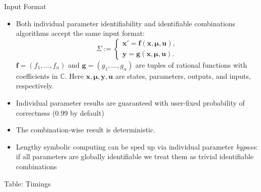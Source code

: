 \documentclass[final,hyperref={pdfpagelabels=false}]{beamer}
\begin{document}
\begin{frame}[t]
\begin{columns}[t]
\begin{column}{.465\textwidth}
\begin{block}{Input Format}
                \begin{itemize}
                    \item Both individual parameter identifiability and identifiable combinations algorithms accept the same input format:
                          \[\Sigma:=\begin{cases}
                                  \mathbf{x}'=\mathbf{f}(\mathbf{x},\boldsymbol{\mu}, \mathbf{u}), \\
                                  \mathbf{y}=\mathbf{g}(\mathbf{x}, \boldsymbol{\mu}, \mathbf{u}).
                              \end{cases}\]
                          \(\mathbf{f}=(f_1, \dots, f_n)\) and \(\mathbf{g}=(g_1,\dots,g_n)\) are tuples of rational functions with coefficients in \(\mathbb{C}\). Here \(\mathbf{x}, \boldsymbol{\mu}, \mathbf{y}, \mathbf{u}\) are states, parameters, outputs, and inputs, respectively.
                    \item Individual parameter results are guaranteed with user-fixed probability of correctness (0.99 by default)
                    \item The combination-wise result is deterministic.
                    \item Lengthy symbolic computing can be sped up via individual parameter \emph{bypass}: if all parameters are globally identifiable we treat them as trivial identifiable combinations
                \end{itemize}

            \end{block}
            \begin{block}{Table: Timings}


\end{block}
\end{column}
\end{columns}
\end{frame}
\end{document}
